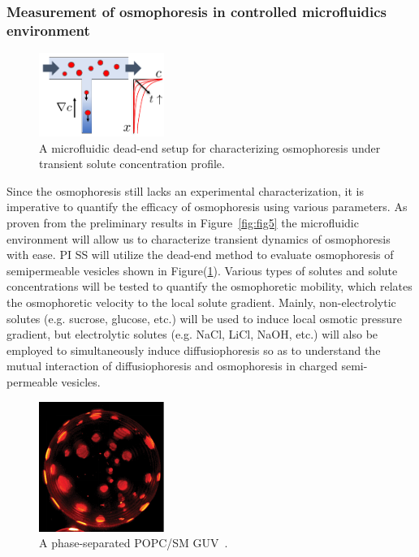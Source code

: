 \documentclass[11pt]{article}
\begin{document}
\subsubsection{Measurement of osmophoresis in controlled microfluidics
environment}
\label{subsubsec:measurement_osmophoresis}
\begin{figure}
\centerline{\includegraphics[width=1.6in]{figs/Microfluidic_dead-end.pdf}}
\caption{\label{fig:Microfluidic_dead-end} A microfluidic dead-end setup
  for characterizing osmophoresis under transient solute concentration
  profile.}
\end{figure}
%
Since the osmophoresis still lacks an experimental characterization, it
is imperative to quantify the efficacy of osmophoresis using various
parameters. As proven from the preliminary results in
Figure~\ref{fig:fig5} the microfluidic environment will allow us to
characterize transient dynamics of osmophoresis with ease.  PI SS will
utilize the dead-end method to evaluate osmophoresis of semipermeable
vesicles shown in Figure(\ref{fig:Microfluidic_dead-end}).  Various
types of solutes and solute concentrations will be tested to quantify
the osmophoretic mobility, which relates the osmophoretic velocity to
the local solute gradient.  Mainly, non-electrolytic solutes (e.g.
sucrose, glucose, etc.) will be used to induce local osmotic pressure
gradient, but electrolytic solutes (e.g. NaCl, LiCl, NaOH, etc.) will
also be employed to simultaneously induce diffusiophoresis so as to
understand the mutual interaction of diffusiophoresis and osmophoresis
in charged semi-permeable vesicles.

\begin{figure}
\vspace*{-10pt}
\centerline{\includegraphics[width=1.6in]{figs/phase-separatedGUV.pdf}}
\caption{\label{fig:phase-separatedGUV} A phase-separated POPC/SM
  GUV~\cite{oglkecka2014}.}
\end{figure}
%
\end{document}
